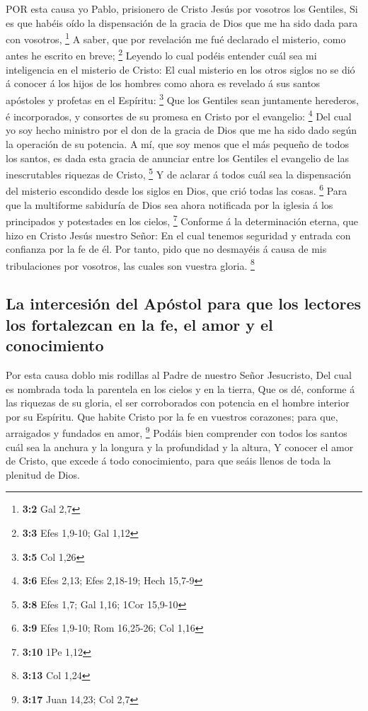  POR esta causa yo Pablo, prisionero de Cristo Jesús por
vosotros los Gentiles,  Si es que habéis oído la
dispensación de la gracia de Dios que me ha sido dada para con vosotros,
\footnote{\textbf{3:2} Gal 2,7}  A saber, que por revelación
me fué declarado el misterio, como antes he escrito en breve;
\footnote{\textbf{3:3} Efes 1,9-10; Gal 1,12}  Leyendo lo
cual podéis entender cuál sea mi inteligencia en el misterio de Cristo:
 El cual misterio en los otros siglos no se dió á conocer á
los hijos de los hombres como ahora es revelado á sus santos apóstoles y
profetas en el Espíritu: \footnote{\textbf{3:5} Col 1,26} 
Que los Gentiles sean juntamente herederos, é incorporados, y consortes
de su promesa en Cristo por el evangelio: \footnote{\textbf{3:6} Efes
  2,13; Efes 2,18-19; Hech 15,7-9}  Del cual yo soy hecho
ministro por el don de la gracia de Dios que me ha sido dado según la
operación de su potencia.  A mí, que soy menos que el más
pequeño de todos los santos, es dada esta gracia de anunciar entre los
Gentiles el evangelio de las inescrutables riquezas de Cristo,
\footnote{\textbf{3:8} Efes 1,7; Gal 1,16; 1Cor 15,9-10}  Y
de aclarar á todos cuál sea la dispensación del misterio escondido desde
los siglos en Dios, que crió todas las cosas. \footnote{\textbf{3:9}
  Efes 1,9-10; Rom 16,25-26; Col 1,16}  Para que la
multiforme sabiduría de Dios sea ahora notificada por la iglesia á los
principados y potestades en los cielos, \footnote{\textbf{3:10} 1Pe 1,12}
 Conforme á la determinación eterna, que hizo en Cristo
Jesús nuestro Señor:  En el cual tenemos seguridad y
entrada con confianza por la fe de él.  Por tanto, pido que
no desmayéis á causa de mis tribulaciones por vosotros, las cuales son
vuestra gloria. \footnote{\textbf{3:13} Col 1,24}

\hypertarget{la-intercesiuxf3n-del-apuxf3stol-para-que-los-lectores-los-fortalezcan-en-la-fe-el-amor-y-el-conocimiento}{%
\subsection{La intercesión del Apóstol para que los lectores los
fortalezcan en la fe, el amor y el
conocimiento}\label{la-intercesiuxf3n-del-apuxf3stol-para-que-los-lectores-los-fortalezcan-en-la-fe-el-amor-y-el-conocimiento}}

 Por esta causa doblo mis rodillas al Padre de nuestro
Señor Jesucristo,  Del cual es nombrada toda la parentela
en los cielos y en la tierra,  Que os dé, conforme á las
riquezas de su gloria, el ser corroborados con potencia en el hombre
interior por su Espíritu.  Que habite Cristo por la fe en
vuestros corazones; para que, arraigados y fundados en amor, \footnote{\textbf{3:17}
  Juan 14,23; Col 2,7}  Podáis bien comprender con todos
los santos cuál sea la anchura y la longura y la profundidad y la
altura,  Y conocer el amor de Cristo, que excede á todo
conocimiento, para que seáis llenos de toda la plenitud de Dios.

